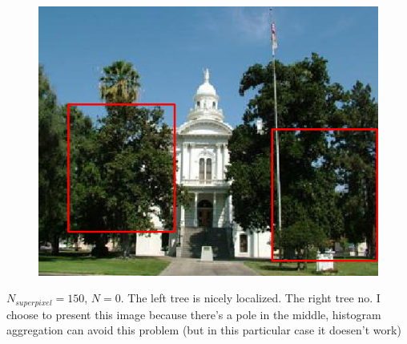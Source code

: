 \documentclass[a4paper,titlepaget]{article}
\begin{document}
\begin{figure}[htpb]
	\centering
	\includegraphics[width=.9\textwidth]{images/results/11fin}
\end{figure}
$N_{superpixel}=150$, $N=0$. The left tree is nicely localized. The right tree no. I choose to present this image because there's a pole in the middle, histogram aggregation can avoid this problem (but in this particular case it doesen't work) 

\newpage
\end{document}
